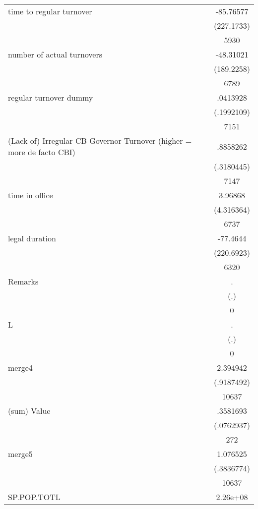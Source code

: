 {\begin{longtable}{l*{1}{c}}
time to regular turnover&   -85.76577\\
                    &  (227.1733)\\
                    &        5930\\
number of actual turnovers&   -48.31021\\
                    &  (189.2258)\\
                    &        6789\\
regular turnover dummy&    .0413928\\
                    &  (.1992109)\\
                    &        7151\\
(Lack of) Irregular CB Governor Turnover (higher = more de facto CBI)&    .8858262\\
                    &  (.3180445)\\
                    &        7147\\
time in office      &     3.96868\\
                    &  (4.316364)\\
                    &        6737\\
legal duration      &    -77.4644\\
                    &  (220.6923)\\
                    &        6320\\
Remarks             &           .\\
                    &         (.)\\
                    &           0\\
L                   &           .\\
                    &         (.)\\
                    &           0\\
merge4              &    2.394942\\
                    &  (.9187492)\\
                    &       10637\\
(sum) Value         &    .3581693\\
                    &  (.0762937)\\
                    &         272\\
merge5              &    1.076525\\
                    &  (.3836774)\\
                    &       10637\\
SP.POP.TOTL         &    2.26e+08\\

\end{longtable}}
